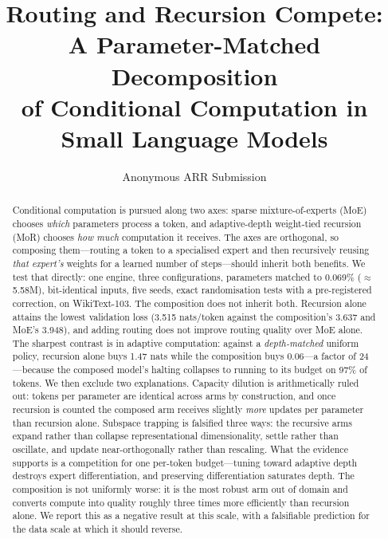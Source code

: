 \documentclass[11pt]{article}
\title{Routing and Recursion Compete: A Parameter-Matched Decomposition\\
of Conditional Computation in Small Language Models}
\author{Anonymous ARR Submission}
\begin{document}
\maketitle

\begin{abstract}
Conditional computation is pursued along two axes: sparse mixture-of-experts
(MoE) chooses \emph{which} parameters process a token, and adaptive-depth
weight-tied recursion (MoR) chooses \emph{how much} computation it receives.
The axes are orthogonal, so composing them---routing a token to a specialised
expert and then recursively reusing \emph{that expert's} weights for a learned
number of steps---should inherit both benefits. We test that directly: one
engine, three configurations, parameters matched to 0.069\% ($\approx$5.58M),
bit-identical inputs, five seeds, exact randomisation tests with a
pre-registered correction, on WikiText-103. The composition does not inherit
both. Recursion alone attains the lowest validation loss (3.515 nats/token
against the composition's 3.637 and MoE's 3.948), and adding routing does not
improve routing quality over MoE alone. The sharpest contrast is in adaptive
computation: against a \emph{depth-matched} uniform policy, recursion alone buys
1.47 nats while the composition buys 0.06---a factor of 24---because the
composed model's halting collapses to running to its budget on 97\% of tokens.
We then exclude two explanations. Capacity dilution is arithmetically ruled out:
tokens per parameter are identical across arms by construction, and once
recursion is counted the composed arm receives slightly \emph{more} updates per
parameter than recursion alone. Subspace trapping is falsified three ways: the
recursive arms expand rather than collapse representational dimensionality,
settle rather than oscillate, and update near-orthogonally rather than
rescaling. What the evidence supports is a competition for one per-token
budget---tuning toward adaptive depth destroys expert differentiation, and
preserving differentiation saturates depth. The composition is not uniformly
worse: it is the most robust arm out of domain and converts compute into quality
roughly three times more efficiently than recursion alone. We report this as a
negative result at this scale, with a falsifiable prediction for the data scale
at which it should reverse.
\end{abstract}







\end{document}
